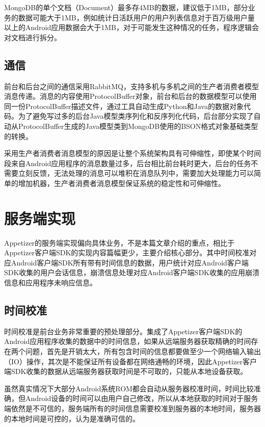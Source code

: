 MongoDB的单个文档（Document）最多存4MB的数据，建议低于1MB，部分业务的数据可能大于1MB，例如统计日活跃用户的用户列表信息对于百万级用户量以上的Android应用数据会大于1MB，对于可能发生这种情况的任务，程序逻辑会对文档进行拆分。

\subsection{通信}
\label{subsec:rabbitmq}

前台和后台之间的通信采用RabbitMQ，支持多机与多机之间的生产者消费者模型消息传递。消息的内容使用ProtocolBuffer对象，前台和后台的数据模型可以使用同一份ProtocolBuffer描述文件，通过工具自动生成Python和Java的数据对象代码。为了避免写过多的后台Java模型类序列化和反序列化代码，后台部分实现了自动从ProtocolBuffer生成的Java模型类到MongoDB使用的BSON格式对象基础类型的转换。

采用生产者消费者消息模型的原因是让整个系统架构具有可伸缩性，即使某个时间段来自Android应用程序的消息数量过多，后台相比前台耗时更大，后台的任务不需要立刻反馈，无法处理的消息可以堆积在消息队列中，需要加大处理能力可以简单的增加机器，生产者消费者消息模型保证系统的稳定性和可伸缩性。

\section{服务端实现}
\label{sec:serverImplementation}

Appetizer的服务端实现偏向具体业务，不是本篇文章介绍的重点，相比于Appetizer客户端SDK的实现内容篇幅更少，主要介绍核心部分。其中时间校准对应Android客户端SDK所有带有时间信息的数据，用户统计对应Android客户端SDK收集的用户会话信息，崩溃信息处理对应Android客户端SDK收集的应用崩溃信息和应用程序未响应信息。

\subsection{时间校准}
\label{subsec:timecorrect}

时间校准是前台业务非常重要的预处理部分。集成了Appetizer客户端SDK的Android应用程序收集的数据中的时间信息，如果从远端服务器获取精确的时间存在两个问题，首先是开销太大，所有包含时间的信息都要做至少一个网络输入输出（IO）操作，其次是不能保证所有设备都在网络通畅的环境，因此Appetizer客户端SDK收集的数据从远端服务器获取时间是不可取的，只能从本地设备获取。

虽然真实情况下大部分Android系统ROM都会自动从服务器校准时间，时间比较准确，但Android设备的时间可以由用户自己修改，所以从本地获取的时间对于服务端依然是不可信的，服务端所有的时间信息需要校准到服务器的本地时间，服务器的本地时间是可控的，认为是准确可信的。

